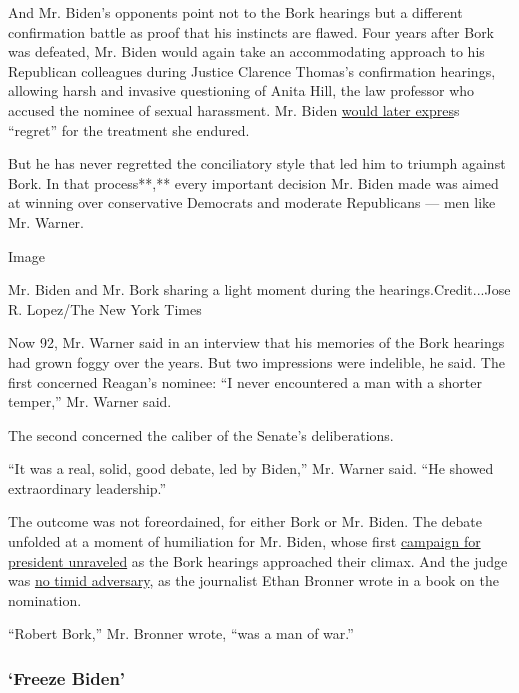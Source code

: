 And Mr. Biden's opponents point not to the Bork hearings but a different
confirmation battle as proof that his instincts are flawed. Four years
after Bork was defeated, Mr. Biden would again take an accommodating
approach to his Republican colleagues during Justice Clarence Thomas's
confirmation hearings, allowing harsh and invasive questioning of Anita
Hill, the law professor who accused the nominee of sexual harassment.
Mr. Biden
\href{https://www.nytimes.com/2019/04/26/us/politics/anita-hill-biden-clarence-thomas.html}{would
later expres}s ``regret'' for the treatment she endured.

But he has never regretted the conciliatory style that led him to
triumph against Bork. In that process**,** every important decision Mr.
Biden made was aimed at winning over conservative Democrats and moderate
Republicans --- men like Mr. Warner.

Image

Mr. Biden and Mr. Bork sharing a light moment during the
hearings.Credit...Jose R. Lopez/The New York Times

Now 92, Mr. Warner said in an interview that his memories of the Bork
hearings had grown foggy over the years. But two impressions were
indelible, he said. The first concerned Reagan's nominee: ``I never
encountered a man with a shorter temper,'' Mr. Warner said.

The second concerned the caliber of the Senate's deliberations.

``It was a real, solid, good debate, led by Biden,'' Mr. Warner said.
``He showed extraordinary leadership.''

The outcome was not foreordained, for either Bork or Mr. Biden. The
debate unfolded at a moment of humiliation for Mr. Biden, whose first
\href{https://www.nytimes.com/2019/06/03/us/politics/biden-1988-presidential-campaign.html}{campaign
for president unraveled} as the Bork hearings approached their climax.
And the judge was
\href{https://www.nytimes.com/2012/12/20/us/robert-h-bork-conservative-jurist-dies-at-85.html}{no
timid adversary}, as the journalist Ethan Bronner wrote in a book on the
nomination.

``Robert Bork,'' Mr. Bronner wrote, ``was a man of war.''

\hypertarget{freeze-biden}{%
\subsubsection{\texorpdfstring{\textbf{`Freeze
Biden'}}{`Freeze Biden'}}\label{freeze-biden}}

